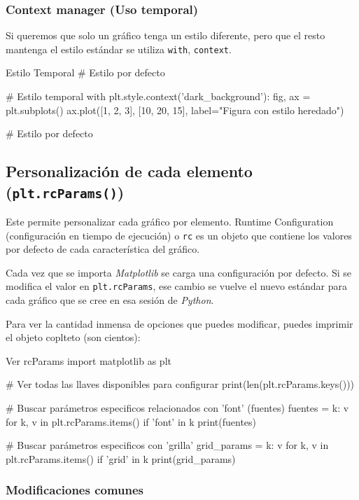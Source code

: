 \subsubsection{Context manager (Uso temporal)}

Si queremos que solo un gráfico tenga un estilo diferente, pero que el resto mantenga el estilo estándar se utiliza \texttt{with}, \texttt{context}.

\begin{pycode}{Estilo Temporal}
# Estilo por defecto

# Estilo temporal
with plt.style.context('dark_background'):
fig, ax = plt.subplots()
ax.plot([1, 2, 3], [10, 20, 15], label="Figura con estilo heredado")

# Estilo por defecto

\end{pycode}



\subsection{Personalización de cada elemento (\texttt{plt.rcParams()})}

Este permite personalizar cada gráfico por elemento. Runtime Configuration (configuración en tiempo de ejecución) o \texttt{rc} es un objeto que contiene los valores por defecto de cada característica del gráfico.

Cada vez que se importa \textit{Matplotlib} se carga una configuración por defecto. Si se modifica el valor en \texttt{plt.rcParams}, ese cambio se vuelve el nuevo estándar para cada gráfico que se cree en esa sesión de \textit{Python}.

Para ver la cantidad inmensa de opciones que puedes modificar, puedes imprimir el objeto coplteto (son cientos):

\begin{pycode}{Ver rcParams}
import matplotlib as plt

# Ver todas las llaves disponibles para configurar
print(len(plt.rcParams.keys()))

# Buscar parámetros especificos relacionados con 'font' (fuentes)
fuentes = {k: v for k, v in plt.rcParams.items() if 'font' in k}
print(fuentes)

# Buscar parámetros especificos con 'grilla'
grid_params = {k: v for k, v in plt.rcParams.items() if 'grid' in k}
print(grid_params)
\end{pycode}

\subsubsection{Modificaciones comunes}

